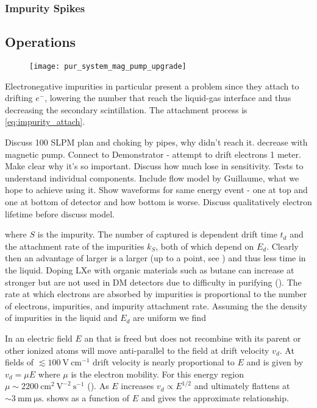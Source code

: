 \subsubsection{Impurity Spikes}
\label{subsubsec:electron_lifetime_model_detector_effects_spikes}



\subsection{Operations}
\label{subsec:electron_lifetime_model_ops}

\begin{figure}
\centering
\texttt{[image: pur\_system\_mag\_pump\_upgrade]}
\caption{}
\label{fig:mag_pump}
\end{figure}

Electronegative impurities
in particular present a problem
since they attach to drifting $e^{-}$,
lowering the number that reach the liquid-gas interface and thus decreasing the secondary scintillation.  The attachment process
is \eqref{eq:impurity_attach}.

Discuss 100 SLPM plan and choking by pipes, why didn't reach it.   decrease with magnetic
pump.  Connect to Demonstrator - attempt to drift electrons 1 meter.  Make clear why it's so important.  Discuss how much lose in
sensitivity.  Tests to understand individual components.  Include flow model by Guillaume, what we hope to achieve using it.  Show
waveforms for same energy event - one at top and one at bottom of detector and how bottom is worse.  Discuss qualitatively electron
lifetime before discuss model.

\noindent where $S$ is the impurity.  The number of \electron captured is dependent drift time $t_{d}$ and the
attachment rate of
the impurities $k_{S}$, both of which depend on $E_{d}$.  Clearly then an advantage of larger
\efields is a larger
\vd (up to a point, see ) and thus less time in the liquid.  Doping LXe with organic materials such as butane
can increase \vd at stronger
\efields but are not used in DM detectors due to difficulty in purifying ().  The rate at which electrons are
absorbed by impurities is proportional to the number of electrons, impurities, and impurity attachment rate.  Assuming the the density
of impurities in the liquid and $E_{d}$ are uniform we find

In an electric field $E$ an \electron that is freed but does not recombine with its parent or other ionized atoms will move anti-parallel
to the field at drift velocity $v_{d}$.  At fields of $\lesssim 100\ \mathrm{V\ cm^{-1}}$ drift velocity is nearly proportional to
$E$ and is given by $v_{d} = \mu E$
where $\mu$ is the electron mobility.  For this energy region $\mu \sim 2200\ \mathrm{cm^{2}\ V^{-2}\ s^{-1}}$ ().  As
$E$ increases $v_{d} \propto E^{1/2}$ and ultimately flattens at $\sim 3\ \mathrm{mm\ \mu s}$.   shows \vd
as a function of $E$ and  gives the approximate relationship.

